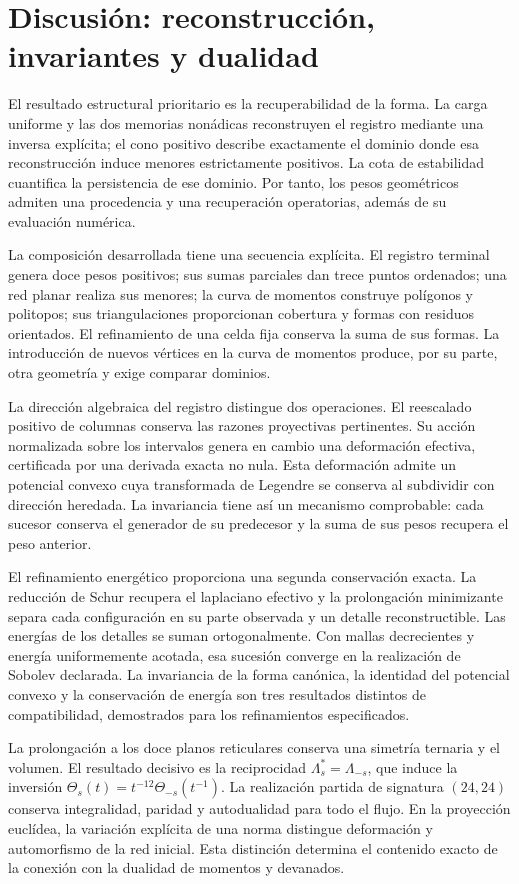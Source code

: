 \documentclass[a4paper,10pt]{article}
\theoremstyle{definition}\newtheorem{definition}[theorem]{Definición}
\theoremstyle{remark}\newtheorem{remark}[theorem]{Observación}
\numberwithin{equation}{section}
\begin{document}
\section{Discusión: reconstrucción, invariantes y dualidad}
\label{sec:discussion}
El resultado estructural prioritario es la recuperabilidad de la forma.
La carga uniforme y las dos memorias nonádicas reconstruyen el registro
mediante una inversa explícita; el cono positivo describe exactamente
el dominio donde esa reconstrucción induce menores estrictamente positivos.
La cota de estabilidad cuantifica la persistencia de ese dominio. Por
tanto, los pesos geométricos admiten una procedencia y una recuperación
operatorias, además de su evaluación numérica.

La composición desarrollada tiene una secuencia explícita. El registro
terminal genera doce pesos positivos; sus sumas parciales dan trece puntos
ordenados; una red planar realiza sus menores; la curva de momentos
construye polígonos y politopos; sus triangulaciones proporcionan cobertura
y formas con residuos orientados. El refinamiento de una celda fija conserva
la suma de sus formas. La introducción de nuevos vértices en la curva de
momentos produce, por su parte, otra geometría y exige comparar dominios.

La dirección algebraica del registro distingue dos operaciones. El
reescalado positivo de columnas conserva las razones proyectivas pertinentes.
Su acción normalizada sobre los intervalos genera en cambio una deformación
efectiva, certificada por una derivada exacta no nula. Esta deformación admite
un potencial convexo cuya transformada de Legendre se conserva al subdividir
con dirección heredada. La invariancia tiene así un mecanismo comprobable:
cada sucesor conserva el generador de su predecesor y la suma de sus pesos recupera
el peso anterior.

El refinamiento energético proporciona una segunda conservación exacta.
La reducción de Schur recupera el laplaciano efectivo y la prolongación
minimizante separa cada configuración en su parte observada y un detalle
reconstructible. Las energías de los detalles se suman ortogonalmente.
Con mallas decrecientes y energía uniformemente acotada, esa sucesión
converge en la realización de Sobolev declarada. La invariancia de la
forma canónica, la identidad del potencial convexo y la conservación de
energía son tres resultados distintos de compatibilidad, demostrados
para los refinamientos especificados.

La prolongación a los doce planos reticulares conserva una simetría
ternaria y el volumen. El resultado decisivo es la reciprocidad
\(\Lambda_s^*=\Lambda_{-s}\), que induce la inversión
\(\Theta_s(t)=t^{-12}\Theta_{-s}(t^{-1})\). La realización partida de
signatura \((24,24)\) conserva integralidad, paridad y autodualidad para
todo el flujo. En la proyección euclídea, la variación explícita de una
norma distingue deformación y automorfismo de la red inicial. Esta
distinción determina el contenido exacto de la conexión con la dualidad
de momentos y devanados.
\end{document}
